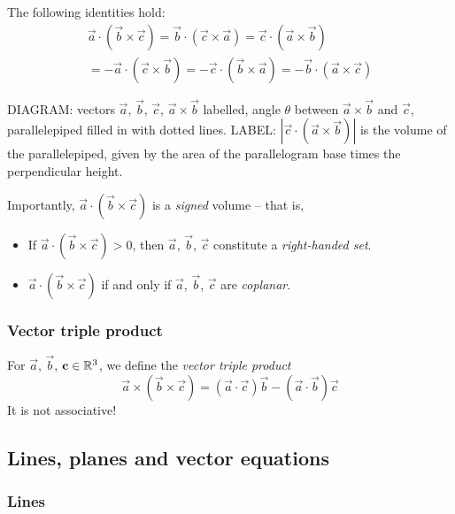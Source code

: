 \documentclass{../../template/note}
\begin{document}
    The following identities hold:
    \begin{align*}
        \vec a \cdot (\vec b \times \vec c) = \vec b \cdot (\vec c \times \vec a) = \vec c \cdot (\vec a \times \vec b) \\
        = -\vec a \cdot (\vec c \times \vec b) = -\vec c \cdot (\vec b \times \vec a) = -\vec b \cdot (\vec a \times \vec c)
    \end{align*}
    
    DIAGRAM: vectors \(\vec a\), \(\vec b\), \(\vec c\), \(\vec a \times \vec b\) labelled, angle \(\theta\) between \(\vec a \times \vec b\) and \(\vec c\), parallelepiped filled in with dotted lines. LABEL: \(|\vec c \cdot (\vec a \times \vec b)|\) is the volume of the parallelepiped, given by the area of the parallelogram base times the perpendicular height.

    Importantly, \(\vec a \cdot (\vec b \times \vec c)\) is a \emph{signed} volume -- that is,
    \begin{itemize}
        \item If \(\vec a \cdot (\vec b \times \vec c) > 0\), then \(\vec a\), \(\vec b\), \(\vec c\) constitute a \emph{right-handed set}.
        \item \(\vec a \cdot (\vec b \times \vec c)\) if and only if \(\vec a\), \(\vec b\), \(\vec c\) are \emph{coplanar}.
    \end{itemize}
    
    \subsubsection{Vector triple product}

    \begin{definition}
        For \(\vec a\), \(\vec b\), \(\vec c \in \RR^3\), we define the \emph{vector triple product}
        \[  
            \vec a \times (\vec b \times \vec c) = (\vec a \cdot \vec c) \vec b - (\vec a \cdot \vec b) \vec c
        \]
        It is not associative!
    \end{definition}
    
    
    \subsection{Lines, planes and vector equations}

    \subsubsection{Lines}
\end{document}
